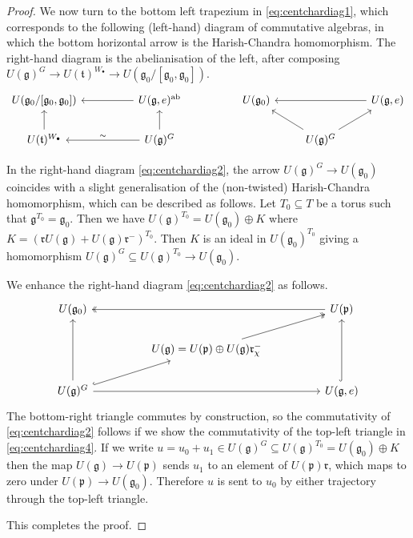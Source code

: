 \documentclass[twoside,12pt,reqno]{amsart}
\theoremstyle{remark}
\numberwithin{equation}{section}
\def\ab{{\operatorname{ab}}}
\def\g{{\mathfrak g}}
\def\p{\mathfrak p}
\def\t{\mathfrak t}
\def\r{\mathfrak{r}}
\begin{document}
\begin{proof}
We now turn to the bottom left trapezium in \eqref{eq:centchardiag1}, which corresponds to the following (left-hand) diagram of commutative algebras, in which the bottom horizontal arrow is the Harish-Chandra homomorphism. The right-hand diagram is the abelianisation of the left, after composing $U(\g)^G\to U(\t)^{W_\bullet}\to U(\g_0/[\g_0,\g_0])$.
\begin{eqnarray}
\label{eq:centchardiag2}
\begin{tikzcd}U(\g_0/[\g_0,\g_0])   & &  U(\g,e)^{\ab} \arrow[ll]
& &  U(\g_0)   & &  U(\g,e) \arrow[ll]
\\
U(\t)^{W_\bullet} \arrow[u]  &   & U(\g)^G \arrow[u] \arrow[ll, "\sim", swap]
& &  & \arrow[ul] U(\g)^G \arrow[ur] &
\end{tikzcd}
\end{eqnarray}

In the right-hand diagram \eqref{eq:centchardiag2}, the arrow $U(\g)^G\to U(\g_0)$ coincides with a slight generalisation of the (non-twisted) Harish-Chandra homomorphism, which can be described as follows. Let $T_0 \subseteq T$ be a torus such that $\g^{T_0} = \g_0$. Then we have $U(\g)^{T_0} = U(\g_0) \oplus K$ where $K = (\r U(\g)+U(\g)\r^{-})^{T_0}$. Then $K$ is an ideal in $U(\g_0)^{T_0}$ giving a homomorphism $U(\g)^G \subseteq U(\g)^{T_0} \to U(\g_0)$.

We enhance the right-hand diagram \eqref{eq:centchardiag2} as follows. \begin{eqnarray}
\label{eq:centchardiag4}
\begin{tikzcd}
U(\g_0)   & & & &   U(\p) \arrow[llll, two heads] \\
& & U(\g)=U(\p)\oplus U(\g)\r_\chi^{-}  \arrow[urr, two heads]  & &  \\
U(\g)^G \arrow[urr, hook] \arrow[uu] \arrow[rrrr] &  & & & U(\g,e) \arrow[uu, hook] 
\end{tikzcd}
\end{eqnarray}
The bottom-right triangle commutes by construction, so the commutativity of \eqref{eq:centchardiag2} follows if we show the commutativity of the top-left triangle in \eqref{eq:centchardiag4}. If we write $u = u_0 + u_1 \in U(\g)^G \subseteq U(\g)^{T_0} = U(\g_0) \oplus K$ then the map $U(\g) \to U(\p)$ sends $u_1$ to an element of $U(\p) \r$, which maps to zero under $U(\p) \to U(\g_0)$. Therefore $u$ is sent to $u_0$ by either trajectory through the top-left triangle.

This completes the proof.
\end{proof}
\end{document}
